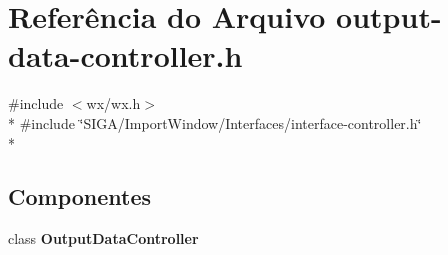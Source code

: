 \section{Referência do Arquivo output-\/data-\/controller.h}
\label{output-data-controller_8h}
{\ttfamily \#include $<$wx/wx.\+h$>$}\\*
{\ttfamily \#include \char`\"{}S\+I\+G\+A/\+Import\+Window/\+Interfaces/interface-\/controller.\+h\char`\"{}}\\*
\subsection*{Componentes}
\begin{DoxyCompactItemize}
\item 
class {\bf Output\+Data\+Controller}
\end{DoxyCompactItemize}
